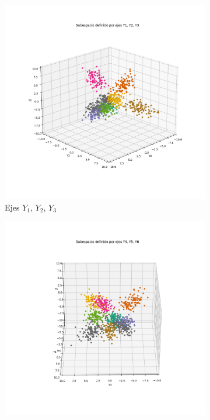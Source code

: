 \documentclass[a4paper,10pt]{article}
\begin{document}
\begin{figure}[H]
	\begin{subfigure}{.5\textwidth}
		\centering
		\includegraphics[width=\textwidth]{imgs/sanger-subespacio-y1_y2_y3.png}
		\caption{Ejes $Y_1$, $Y_2$, $Y_3$}
		\label{fig:sanger-1er_subesp}
	\end{subfigure}%
	\begin{subfigure}{.5\textwidth}
		\centering
		\includegraphics[width=\textwidth]{imgs/sanger-subespacio-y4_y5_y6.png}

\end{subfigure}
\end{figure}
\end{document}
